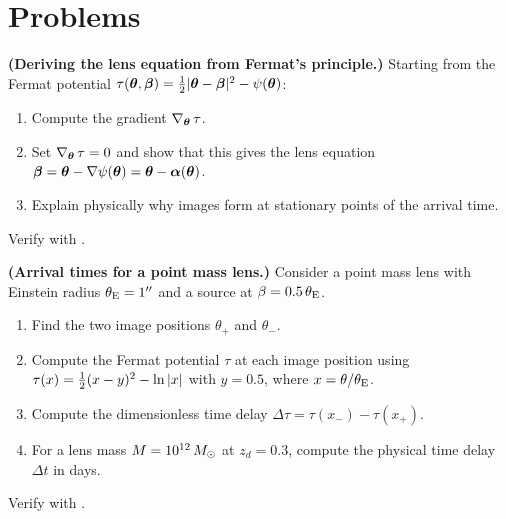 \section{Problems}
\label{sec:fermat_problems}

\begin{exercise}
\label{ex:fermat_lens_eq}
\textbf{(Deriving the lens equation from Fermat's principle.)}
Starting from the Fermat potential
$\tau(\boldsymbol{\theta}, \boldsymbol{\beta}) = \tfrac{1}{2}|\boldsymbol{\theta} - \boldsymbol{\beta}|^2
- \psi(\boldsymbol{\theta})$:
\begin{enumerate}[label=(\alph*)]
    \item Compute the gradient $\nabla_{\boldsymbol{\theta}}\,\tau$.
    \item Set $\nabla_{\boldsymbol{\theta}}\,\tau = 0$ and show that this gives
          the lens equation
          $\boldsymbol{\beta} = \boldsymbol{\theta} - \nabla\psi(\boldsymbol{\theta})
          = \boldsymbol{\theta} - \boldsymbol{\alpha}(\boldsymbol{\theta})$.
    \item Explain physically why images form at stationary points of
          the arrival time.
\end{enumerate}
Verify with
.
\end{exercise}

\begin{exercise}
\label{ex:point_mass_arrival}
\textbf{(Arrival times for a point mass lens.)}
Consider a point mass lens with Einstein radius $\theta_{\mathrm{E}} = 1''$ and a
source at $\beta = 0.5\,\theta_{\mathrm{E}}$.
\begin{enumerate}[label=(\alph*)]
    \item Find the two image positions $\theta_+$ and $\theta_-$.
    \item Compute the Fermat potential $\tau$ at each image position
          using $\tau(x) = \tfrac{1}{2}(x - y)^2 - \ln|x|$ with $y = 0.5$,
          where $x = \theta / \theta_{\mathrm{E}}$.
    \item Compute the dimensionless time delay
          $\Delta\tau = \tau(x_-) - \tau(x_+)$.
    \item For a lens mass $M = 10^{12}\,M_{\odot}$ at $z_d = 0.3$, compute
          the physical time delay $\Delta t$ in days.
\end{enumerate}
Verify with
.
\end{exercise}

